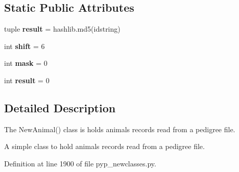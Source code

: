 \subsection*{Static Public Attributes}
\begin{DoxyCompactItemize}
\item 
\hypertarget{classPyPedal_1_1pyp__newclasses_1_1NewAnimal_a64adf06733cee5d501e3683664884f98}{
tuple {\bfseries result} = hashlib.md5(idstring)}
\label{classPyPedal_1_1pyp__newclasses_1_1NewAnimal_a64adf06733cee5d501e3683664884f98}

\item 
\hypertarget{classPyPedal_1_1pyp__newclasses_1_1NewAnimal_a5784e4a41e1abb82304713d326ff1d6c}{
int {\bfseries shift} = 6}
\label{classPyPedal_1_1pyp__newclasses_1_1NewAnimal_a5784e4a41e1abb82304713d326ff1d6c}

\item 
\hypertarget{classPyPedal_1_1pyp__newclasses_1_1NewAnimal_a2ee518d81a33e2a88211ea2b014f4c43}{
int {\bfseries mask} = 0}
\label{classPyPedal_1_1pyp__newclasses_1_1NewAnimal_a2ee518d81a33e2a88211ea2b014f4c43}

\item 
\hypertarget{classPyPedal_1_1pyp__newclasses_1_1NewAnimal_ac6426c67cbb389f5f57bc5366a354fa5}{
int {\bfseries result} = 0}
\label{classPyPedal_1_1pyp__newclasses_1_1NewAnimal_ac6426c67cbb389f5f57bc5366a354fa5}

\end{DoxyCompactItemize}


\subsection{Detailed Description}
The NewAnimal() class is holds animals records read from a pedigree file. \begin{DoxyVerb}A simple class to hold animals records read from a pedigree file.\end{DoxyVerb}
 

Definition at line 1900 of file pyp\_\-newclasses.py.



